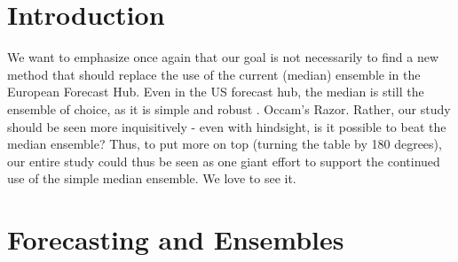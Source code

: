









\tableofcontents

\clearpage

\listoffigures
\clearpage


\printacronyms
\clearpage





\normalsize
\vspace{2cm}
\section{Introduction}

We want to emphasize once again that our goal is not necessarily to find a new method that should replace the use of the current (median) ensemble in the European Forecast Hub. Even in the US forecast hub, the median is still the ensemble of choice, as it is simple and robust \citep{ray_ensemble_2020}. Occam's Razor. Rather, our study should be seen more inquisitively - even with hindsight, is it possible to beat the median ensemble? Thus, to put more on top (turning the table by 180 degrees), our entire study could thus be seen as one giant effort to support the continued use of the simple median ensemble. We love to see it.
\section{Forecasting and Ensembles}

